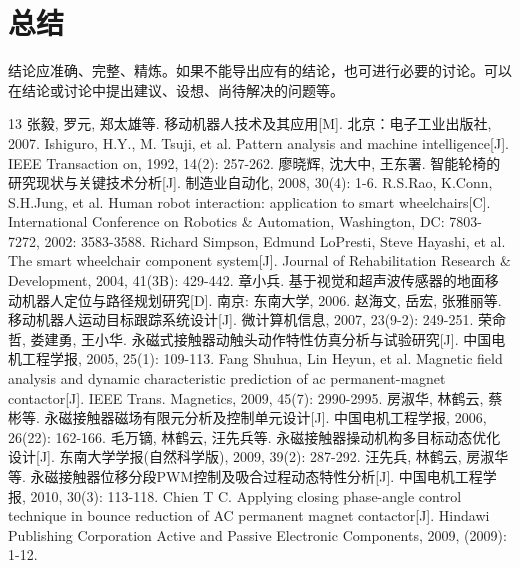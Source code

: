 \documentclass{seu-report}
\begin{document}
\section{总结}

结论应准确、完整、精炼。如果不能导出应有的结论，也可进行必要的讨论。可以在结论或讨论中提出建议、设想、尚待解决的问题等。

\begin{thebibliography}{13}
 张毅, 罗元, 郑太雄等. 移动机器人技术及其应用[M]. 北京：电子工业出版社, 2007.
 Ishiguro, H.Y., M. Tsuji, et al. Pattern analysis and machine intelligence[J]. IEEE Transaction on, 1992, 14(2): 257-262.
 廖晓辉, 沈大中, 王东署. 智能轮椅的研究现状与关键技术分析[J]. 制造业自动化, 2008, 30(4): 1-6.
 R.S.Rao, K.Conn, S.H.Jung, et al. Human robot interaction: application to smart wheelchairs[C]. International Conference on Robotics \& Automation, Washington, DC: 7803-7272, 2002: 3583-3588.
 Richard Simpson, Edmund LoPresti, Steve Hayashi, et al. The smart wheelchair component system[J]. Journal of Rehabilitation Research \& Development, 2004, 41(3B): 429-442.
 章小兵. 基于视觉和超声波传感器的地面移动机器人定位与路径规划研究[D]. 南京: 东南大学, 2006.
 赵海文, 岳宏, 张雅丽等. 移动机器人运动目标跟踪系统设计[J]. 微计算机信息, 2007, 23(9-2): 249-251.
 荣命哲, 娄建勇, 王小华. 永磁式接触器动触头动作特性仿真分析与试验研究[J]. 中国电机工程学报, 2005, 25(1): 109-113.
 Fang Shuhua, Lin Heyun, et al. Magnetic field analysis and dynamic characteristic prediction of ac permanent-magnet contactor[J]. IEEE Trans. Magnetics, 2009, 45(7): 2990-2995.
 房淑华, 林鹤云, 蔡彬等. 永磁接触器磁场有限元分析及控制单元设计[J]. 中国电机工程学报, 2006, 26(22): 162-166.
 毛万镝, 林鹤云, 汪先兵等. 永磁接触器操动机构多目标动态优化设计[J]. 东南大学学报(自然科学版), 2009, 39(2): 287-292.
 汪先兵, 林鹤云, 房淑华等. 永磁接触器位移分段PWM控制及吸合过程动态特性分析[J]. 中国电机工程学报, 2010, 30(3): 113-118.
 Chien T C. Applying closing phase-angle control technique in bounce reduction of AC permanent magnet contactor[J]. Hindawi Publishing Corporation Active and Passive Electronic Components, 2009, (2009): 1-12.
\end{thebibliography}
\end{document}
